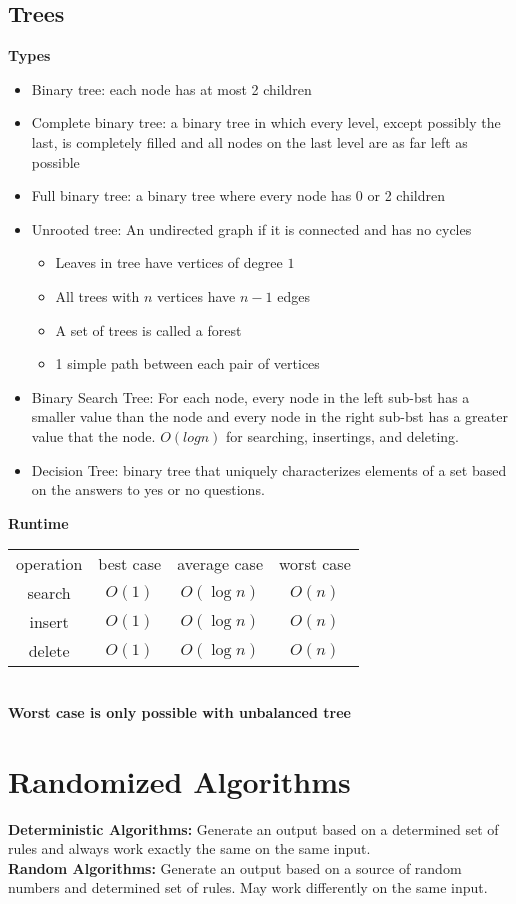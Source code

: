 \documentclass{article}
\begin{document}
\begin{spacing}{1.5}
\subsection{Trees}
\label{sec:trees}
\textbf{Types}
\begin{itemize}
    \item Binary tree: each node has at most 2 children
    \item Complete binary tree: a binary tree in which every level, except possibly the last, is completely filled and all nodes on the last level are as far left as possible
    \item Full binary tree: a binary tree where every node has 0 or 2 children
    \item Unrooted tree: An undirected graph if it is connected and has no cycles
    \begin{itemize}
        \item Leaves in tree have vertices of degree $1$
        \item All trees with $n$ vertices have $n-1$ edges
        \item A set of trees is called a forest
        \item 1 simple path between each pair of vertices
    \end{itemize}
    \item Binary Search Tree: For each node, every node in the left sub-bst has a smaller value than the node and every node in the right sub-bst has a greater value that the node. $O(logn)$ for searching, insertings, and deleting.
    \item Decision Tree: binary tree that uniquely characterizes elements of a set based on the answers to yes or no questions.
\end{itemize}
\textbf{Runtime}\\
\begin{tabular}{c|c|c|c}
     operation & best case & average case & worst case \\
     search & $O(1) $ & $O(\log n)$ & $O(n)$ \\
     insert & $O(1) $ & $O(\log n)$ & $O(n)$ \\
     delete & $O(1) $ & $O(\log n)$ & $O(n)$ \\
\end{tabular}\\
\textbf{Worst case is only possible with unbalanced tree}\\
\newpage
\section{Randomized Algorithms}
\label{sec:randalgo}
\textbf{Deterministic Algorithms:} Generate an output based on a determined set of rules and always work exactly the same on the same input.\\
\textbf{Random Algorithms:} Generate an output based on a source of random numbers and determined set of rules. May work differently on the same input.\\

\end{spacing}
\end{document}

